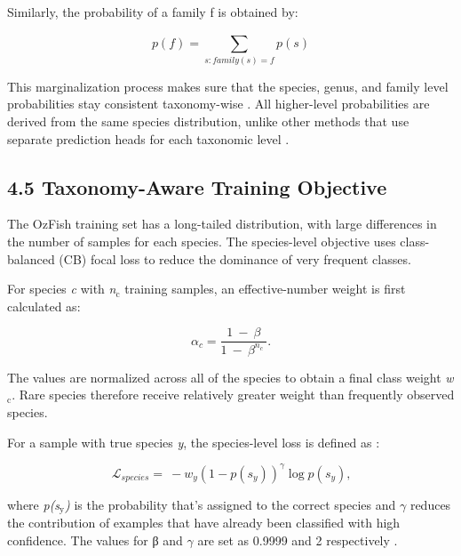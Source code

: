 \documentclass[preprint,12pt]{elsarticle}
\providecommand{\textsubscript}[1]{\ensuremath{_{\text{#1}}}}
\begin{document}
Similarly, the probability of a family f is obtained by:

\begin{equation}
p(f) = \sum_{s:family(s) = f}^{}{p(s)}
\end{equation}

This marginalization process makes sure that the species, genus, and
family level probabilities stay consistent taxonomy-wise
\cite{ref24}
\cite{ref61}. All higher-level probabilities are
derived from the same species distribution, unlike other methods that
use separate prediction heads for each taxonomic level
\cite{ref23}
\cite{ref26}
\cite{ref60}.

\subsection*{4.5 Taxonomy-Aware Training
Objective}\label{taxonomy-aware-training-objective}

The OzFish training set has a long-tailed distribution, with large
differences in the number of samples for each species. The species-level
objective uses class-balanced (CB) focal loss
\cite{ref14}
\cite{ref63} to reduce the dominance of very
frequent classes.

For species \emph{c} with \emph{n\textsubscript{c}} training samples, an
effective-number weight is first calculated
as\cite{ref14}:

\begin{equation}
\alpha_{c} = \frac{1\  - \ \beta}{1\  - \ \beta^{n_{c}}\ }\text{.}
\end{equation}

The values are normalized across all of the species to obtain a final
class weight \emph{w\textsubscript{c}}. Rare species therefore receive
relatively greater weight than frequently observed species.

For a sample with true species \emph{y}, the species-level loss is
defined as \cite{ref14}
\cite{ref63}:

\begin{equation}
\mathcal{L}_{species} = \  - w_{y}\left( 1 - p\left( s_{y} \right) \right)^{\gamma}\log{p(s_{y})}\text{,}
\end{equation}

where \emph{p(s\textsubscript{y})} is the probability that's assigned to
the correct species and \(\gamma\) reduces the contribution of examples
that have already been classified with high confidence. The values for β
and \(\gamma\) are set as 0.9999 and 2 respectively
\cite{ref14}
\cite{ref63}.
\end{document}
